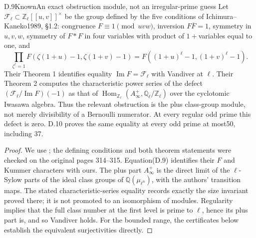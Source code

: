 \begin{statement}{D.9}{Known}{An exact obstruction module, not an irregular-prime guess}
Let $\mathcal F_\ell\subset\mathbb Z_\ell[[u,v]]^\times$ be the group defined by the five conditions of Ichimura--Kaneko1989, \S1.2: congruence $F\equiv1\pmod{uvw}$, inversion $F\overline F=1$, symmetry in $u,v,w$, symmetry of $F*F$ in four variables with product of $1+$variables equal to one, and
\[
 \prod_{\zeta^\ell=1}F(\zeta(1+u)-1,\zeta(1+v)-1)
       =F((1+u)^\ell-1,(1+v)^\ell-1).
\]
Their Theorem 1 identifies equality $\operatorname{Im}F=\mathcal F_\ell$ with Vandiver at $\ell$. Their Theorem 2 computes the characteristic power series of the defect $(\mathcal F_\ell/\operatorname{Im}F)(-1)$ as that of
$\operatorname{Hom}_{\mathbb Z_\ell}(A_\infty^+,\mathbb Q_\ell/\mathbb Z_\ell)$ over the cyclotomic Iwasawa algebra. Thus the relevant obstruction is the plus class-group module, not merely divisibility of a Bernoulli numerator. At every regular odd prime this defect is zero. D.10 proves the same equality at every odd prime at most50, including 37.
\end{statement}
\begin{proof}
We use \cite[Theorems1--2]{dIchimuraKaneko1989}; the defining conditions and both theorem statements were checked on the original pages 314--315. Equation(D.9) identifies their $F$ and Kummer characters with ours. The plus part $A_\infty^+$ is the direct limit of the $\ell$-Sylow parts of the ideal class groups of $\mathbb Q(\mu_{\ell^n})$, with the authors' transition maps. The stated characteristic-series equality records exactly the size invariant proved there; it is not promoted to an isomorphism of modules. Regularity implies that the full class number at the first level is prime to $\ell$, hence its plus part is, and so Vandiver holds. For the bounded range, the certificates below establish the equivalent surjectivities directly.
\end{proof}

